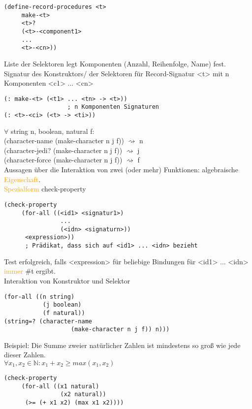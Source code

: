 \documentclass[paper=a4, fontsize=11pt]{scrartcl}
\numberwithin{equation}{section}
\numberwithin{figure}{section}
\numberwithin{table}{section}
\begin{document}
\begin{lstlisting}
(define-record-procedures <t>
     make-<t>
     <t>?
     (<t>-<component1>
     ...
     <t>-<cn>))
\end{lstlisting}

Liste der Selektoren legt Komponenten (Anzahl, Reihenfolge, Name) fest. \\
Signatur des Konstruktors/ der Selektoren für Record-Signatur <t> mit n Komponenten <c1> ... <cn> 
\begin{lstlisting}
(: make-<t> (<t1> ... <tn> -> <t>))
                  ; n Komponenten Signaturen
(: <t>-<ci> (<t> -> <ti>))                  
\end{lstlisting}
$\forall$ string n, boolean, natural f: \\
(character-name (make-character n j f)) $\rightsquigarrow$ n \\
(character-jedi? (make-character n j f)) $\rightsquigarrow$ j \\
(character-force (make-character n j f)) $\rightsquigarrow$ f \\

Aussagen über die Interaktion von zwei (oder mehr) Funktionen: algebraische \textcolor{orange}{Eigenschaft}. \\

\textcolor{orange}{Spezialform} check-property
\begin{lstlisting}
(check-property
     (for-all ((<id1> <signatur1>)
                ...
                (<idn> <signaturn>))
      <expression>))      
      ; Prädikat, dass sich auf <id1> ... <idn> bezieht    
\end{lstlisting}
Test erfolgreich, falls <expression> für beliebige Bindungen für <id1> ... <idn> \textcolor{orange}{immer} \#t ergibt. \\
Interaktion von Konstruktor und Selektor 
\begin{lstlisting}
(for-all ((n string)
           (j boolean)
           (f natural))
(string=? (character-name
                   (make-character n j f)) n)))           
\end{lstlisting}
Beispiel: Die Summe zweier natürlicher Zahlen ist mindestens so groß wie jede dieser Zahlen. \\
$\forall x_{1},x_{2} \in \mathbb{N}: x_{1} + x_{2} \geq max(x_{1}, x_{2})$ 
\begin{lstlisting}
(check-property
     (for-all ((x1 natural)
                (x2 natural))
      (>= (+ x1 x2) (max x1 x2))))            
\end{lstlisting}
\end{document}
